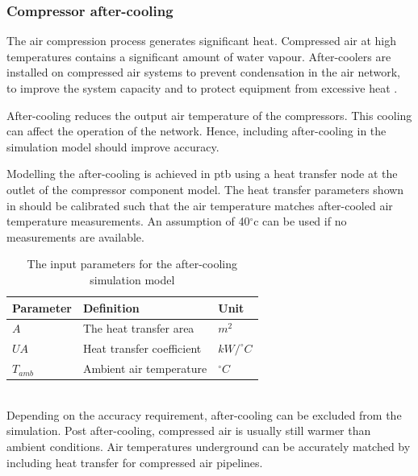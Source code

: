 		\subsubsection{Compressor after-cooling}
		The air compression process generates significant heat. Compressed air at high temperatures contains a significant amount of water vapour. After-coolers are installed on compressed air systems to prevent condensation in the air network, to improve the system capacity and to protect equipment from excessive heat \cite{schroeder2009energy}.
		\par 
		After-cooling reduces the output air temperature of the compressors. This cooling can affect the operation of the network. Hence, including after-cooling in the simulation model should improve accuracy.
		\par
		Modelling the after-cooling is achieved in \gls{ptb} using a heat transfer node at the outlet of the compressor component model. The heat transfer parameters shown in  should be calibrated such that the air temperature matches after-cooled air temperature measurements. An assumption of 40$^\circ$\gls{c} can be used if no measurements are available. 
\\
		\begin{table}[h!]
			\caption{The input parameters for the after-cooling simulation model}
			\centering
			\begin{tabular}{lll}
				\hline 
				Parameter \hspace{1cm} & Definition \hspace{4cm} & Unit \\
				\hline
				$A$ & The heat transfer area & $m^2$ \\
				$UA$ & Heat transfer coefficient & $kW/^{\circ} C$ \\
				$T_{amb}$ & Ambient air temperature & $^{\circ} C$ \\
				\hline
			\end{tabular}
		\label{table: After cooling inputs}
		\end{table}
	\\
	Depending on the accuracy requirement, after-cooling can be excluded from the simulation. Post after-cooling, compressed air is usually still warmer than ambient conditions. Air temperatures underground can be accurately matched by including heat transfer for compressed air pipelines.
	
